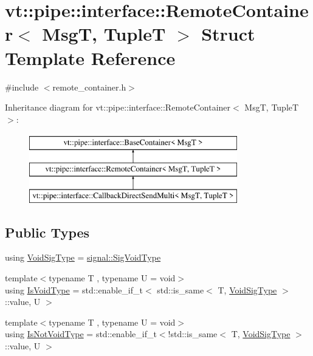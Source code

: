 \hypertarget{structvt_1_1pipe_1_1interface_1_1_remote_container}{}\section{vt\+:\+:pipe\+:\+:interface\+:\+:Remote\+Container$<$ MsgT, TupleT $>$ Struct Template Reference}
\label{structvt_1_1pipe_1_1interface_1_1_remote_container}


{\ttfamily \#include $<$remote\+\_\+container.\+h$>$}

Inheritance diagram for vt\+:\+:pipe\+:\+:interface\+:\+:Remote\+Container$<$ MsgT, TupleT $>$\+:\begin{figure}[H]
\begin{center}
\leavevmode
\includegraphics[height=3.000000cm]{structvt_1_1pipe_1_1interface_1_1_remote_container}
\end{center}
\end{figure}
\subsection*{Public Types}
\begin{DoxyCompactItemize}
\item 
using \hyperlink{structvt_1_1pipe_1_1interface_1_1_remote_container_a04acc410a9a9da0ec211043db91b7559}{Void\+Sig\+Type} = \hyperlink{namespacevt_1_1pipe_1_1signal_acbe257d1ae44f20fa9fd9b6ed3057caf}{signal\+::\+Sig\+Void\+Type}
\item 
{\footnotesize template$<$typename T , typename U  = void$>$ }\\using \hyperlink{structvt_1_1pipe_1_1interface_1_1_remote_container_a0cf5387a6b1db885a7a224bab60ce16d}{Is\+Void\+Type} = std\+::enable\+\_\+if\+\_\+t$<$ std\+::is\+\_\+same$<$ T, \hyperlink{structvt_1_1pipe_1_1interface_1_1_remote_container_a04acc410a9a9da0ec211043db91b7559}{Void\+Sig\+Type} $>$\+::value, U $>$
\item 
{\footnotesize template$<$typename T , typename U  = void$>$ }\\using \hyperlink{structvt_1_1pipe_1_1interface_1_1_remote_container_a1dc69f6cfa1318c856a412940e3dbb50}{Is\+Not\+Void\+Type} = std\+::enable\+\_\+if\+\_\+t$<$!std\+::is\+\_\+same$<$ T, \hyperlink{structvt_1_1pipe_1_1interface_1_1_remote_container_a04acc410a9a9da0ec211043db91b7559}{Void\+Sig\+Type} $>$\+::value, U $>$
\end{DoxyCompactItemize}
